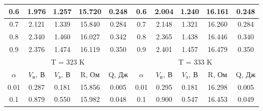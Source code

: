\documentclass[a4paper, 12pt]{article}%
\begin{document}
\begin{table}[H]
\begin{tabular}{|ccccc|ccccc|}
			\multicolumn{1}{|c|}{0.6}   & \multicolumn{1}{c|}{1.976}   & \multicolumn{1}{c|}{1.257}     & \multicolumn{1}{c|}{15.720}  & 0.248      & \multicolumn{1}{c|}{0.6}   & \multicolumn{1}{c|}{2.004}   & \multicolumn{1}{c|}{1.240}     & \multicolumn{1}{c|}{16.161}  & 0.248      \\ \hline
			\multicolumn{1}{|c|}{0.7}   & \multicolumn{1}{c|}{2.121}   & \multicolumn{1}{c|}{1.339}     & \multicolumn{1}{c|}{15.840}  & 0.284      & \multicolumn{1}{c|}{0.7}   & \multicolumn{1}{c|}{2.148}   & \multicolumn{1}{c|}{1.321}     & \multicolumn{1}{c|}{16.260}  & 0.284      \\ \hline
			\multicolumn{1}{|c|}{0.8}   & \multicolumn{1}{c|}{2.340}   & \multicolumn{1}{c|}{1.460}     & \multicolumn{1}{c|}{16.027}  & 0.342      & \multicolumn{1}{c|}{0.8}   & \multicolumn{1}{c|}{2.365}   & \multicolumn{1}{c|}{1.438}     & \multicolumn{1}{c|}{16.446}  & 0.340      \\ \hline
			\multicolumn{1}{|c|}{0.9}   & \multicolumn{1}{c|}{2.376}   & \multicolumn{1}{c|}{1.474}     & \multicolumn{1}{c|}{16.119}  & 0.350      & \multicolumn{1}{c|}{0.9}   & \multicolumn{1}{c|}{2.401}   & \multicolumn{1}{c|}{1.457}     & \multicolumn{1}{c|}{16.479}  & 0.350      \\ \hline
			\multicolumn{5}{|c|}{T = 323 K}                                                                                                            & \multicolumn{5}{c|}{T = 333 K}                                                                                                            \\ \hline
			\multicolumn{1}{|c|}{$\alpha$} & \multicolumn{1}{c|}{$V_{н}, ~ В$} & \multicolumn{1}{c|}{$V_{э}, ~ В$} & \multicolumn{1}{c|}{R, Ом} & Q, Дж & \multicolumn{1}{c|}{$\alpha$} & \multicolumn{1}{c|}{$V_{н}, ~ В$} & \multicolumn{1}{c|}{$V_{э}, ~ В$} & \multicolumn{1}{c|}{R, Ом} & Q, Дж \\ \hline
			\multicolumn{1}{|c|}{0.01}  & \multicolumn{1}{c|}{0.287}   & \multicolumn{1}{c|}{0.181}     & \multicolumn{1}{c|}{15.856}  & 0.005      & \multicolumn{1}{c|}{0.01}  & \multicolumn{1}{c|}{0.295}   & \multicolumn{1}{c|}{0.181}     & \multicolumn{1}{c|}{16.298}  & 0.005      \\ \hline
			\multicolumn{1}{|c|}{0.1}   & \multicolumn{1}{c|}{0.879}   & \multicolumn{1}{c|}{0.550}     & \multicolumn{1}{c|}{15.982}  & 0.048      & \multicolumn{1}{c|}{0.1}   & \multicolumn{1}{c|}{0.900}   & \multicolumn{1}{c|}{0.547}     & \multicolumn{1}{c|}{16.453}  & 0.049      \\ \hline

\end{tabular}
\end{table}
\end{document}
